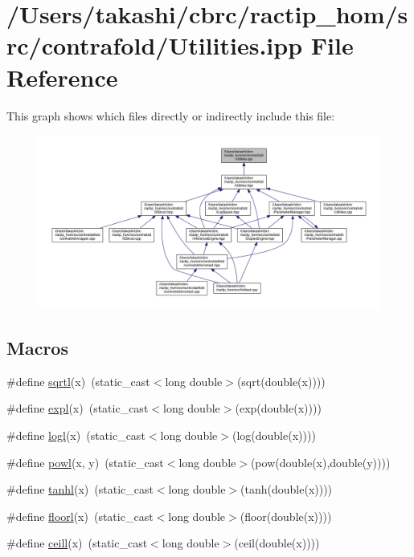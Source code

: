 \hypertarget{contrafold_2_utilities_8ipp}{\section{/\+Users/takashi/cbrc/ractip\+\_\+hom/src/contrafold/\+Utilities.ipp File Reference}
\label{contrafold_2_utilities_8ipp}
}
This graph shows which files directly or indirectly include this file\+:
\nopagebreak
\begin{figure}[H]
\begin{center}
\leavevmode
\includegraphics[width=350pt]{contrafold_2_utilities_8ipp__dep__incl}
\end{center}
\end{figure}
\subsection*{Macros}
\begin{DoxyCompactItemize}
\item 
\#define \hyperlink{contrafold_2_utilities_8ipp_adec5708ea4f27b718663e2a57e73303a}{sqrtl}(x)~(static\+\_\+cast$<$long double$>$(sqrt(double(x))))
\item 
\#define \hyperlink{contrafold_2_utilities_8ipp_a3262d247d0e746116959ee487aed42e1}{expl}(x)~(static\+\_\+cast$<$long double$>$(exp(double(x))))
\item 
\#define \hyperlink{contrafold_2_utilities_8ipp_af30ed28c10eaaab05f92d1043d458741}{logl}(x)~(static\+\_\+cast$<$long double$>$(log(double(x))))
\item 
\#define \hyperlink{contrafold_2_utilities_8ipp_a38ce40625edb986ea847a15a34615cc1}{powl}(x, y)~(static\+\_\+cast$<$long double$>$(pow(double(x),double(y))))
\item 
\#define \hyperlink{contrafold_2_utilities_8ipp_a99028516a5b84b8232290731299c72cd}{tanhl}(x)~(static\+\_\+cast$<$long double$>$(tanh(double(x))))
\item 
\#define \hyperlink{contrafold_2_utilities_8ipp_a0ea134b0841e1599acca1a6798ef4607}{floorl}(x)~(static\+\_\+cast$<$long double$>$(floor(double(x))))
\item 
\#define \hyperlink{contrafold_2_utilities_8ipp_a8bd1d8e6a787be7c41651531bb76e2f8}{ceill}(x)~(static\+\_\+cast$<$long double$>$(ceil(double(x))))
\end{DoxyCompactItemize}
